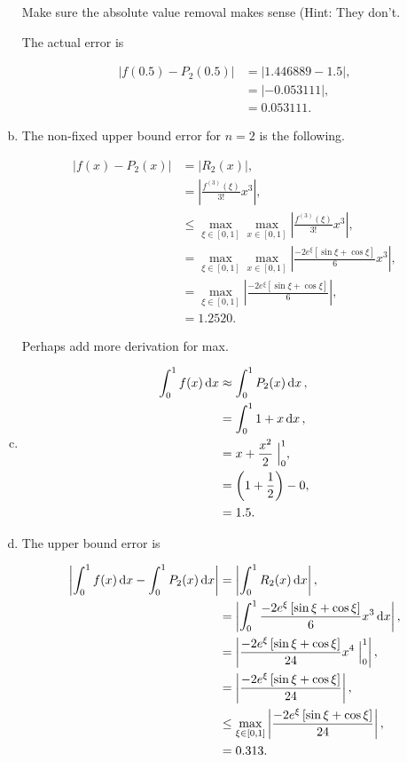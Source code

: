 \documentclass[a4paper, 10pt]{article}
\newenvironment{answer}[1][Answer]{\begin{trivlist}
\item[\hskip\labelsep{\textit{#1.}}]}{\end{trivlist}}
\begin{document}
\begin{answer}
\begin{enumerate}[(a)]
			{\color{blue} Make sure the absolute value removal makes sense (Hint: They don't.}

			The actual error is

			\begin{align*}
				| f(0.5) - P_2(0.5) | &= | 1.446889 - 1.5 |,\\
				&= | - 0.053111 |,\\
				&= 0.053111.
			\end{align*}

		\item The non-fixed upper bound error for $n=2$ is the following.

			\begin{align*}
				| f(x) - P_2(x) | &= | R_2 (x) |,\\
				&= | \frac{f^{(3)}(\xi)}{3!} x^3 |,\\
				&\leq \max_{\xi \in [0,1]} \max_{x\in [0, 1]} \left| \frac{f^{(3)}(\xi)}{3!} x^3 \right|,\\
				&= \max_{\xi \in [0,1]} \max_{x\in [0, 1]} \left| \frac{-2 e^\xi \left[ \sin{\xi} + \cos{\xi} \right]}{6} x^3 \right|,\\ 
				&= \max_{\xi \in [0,1]} \left| \frac{-2 e^\xi \left[ \sin{\xi} + \cos{\xi} \right]}{6} \right|,\\
				&= 1.2520.
			\end{align*}

			{\color{blue} Perhaps add more derivation for max.}

		\item 

			\begin{align*}
				\int_0^1 f(x) \dd{x} &\approx \int_0^1 P_2(x) \dd{x},\\
				&= \int_0^1 1 + x \dd{x},\\
				&= x + \frac{x^2}{2} \Bigm|_0^1,\\
				&= \left( 1 + \frac{1}{2} \right) - 0,\\
				&= 1.5.
			\end{align*}

		\item The upper bound error is 

			\begin{align*}
				\left| \int_0^1 f(x) \dd{x} - \int_0^1 P_2(x) \dd{x} \right| 
				&= \left| \int_0^1 R_2(x) \dd{x} \right|,\\
				&= \left| \int_0^1 \frac{-2 e^\xi \left[ \sin{\xi} + \cos{\xi} \right]}{6} x^3 \dd{x} \right|,\\
				&= \left| \frac{-2 e^\xi \left[ \sin{\xi} + \cos{\xi} \right]}{24} x^4 \Bigm|_0^1  \right|,\\
				&= \left| \frac{-2 e^\xi \left[ \sin{\xi} + \cos{\xi} \right]}{24} \right|,\\
				&\leq \max_{\xi\in[0,1]} \left| \frac{-2 e^\xi \left[ \sin{\xi} + \cos{\xi} \right]}{24} \right|,\\
				&= 0.313.
			\end{align*}


\end{enumerate}
\end{answer}
\end{document}
